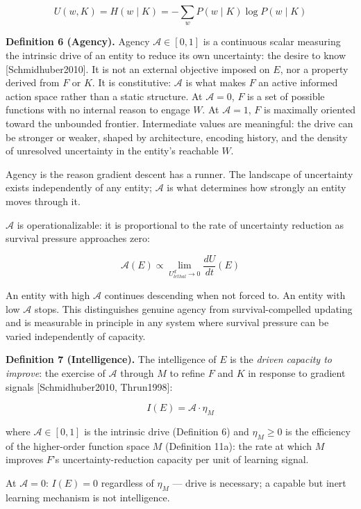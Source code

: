 \documentclass[
]{article}
\begin{document}
\[U(w, K) = H(w \mid K) = -\sum_w P(w \mid K) \log P(w \mid K)\]

\textbf{Definition 6 (Agency).} Agency \(\mathcal{A} \in [0, 1]\) is a
continuous scalar measuring the intrinsic drive of an entity to reduce
its own uncertainty: the desire to know {[}Schmidhuber2010{]}. It is not
an external objective imposed on \(E\), nor a property derived from
\(F\) or \(K\). It is constitutive: \(\mathcal{A}\) is what makes \(F\)
an active informed action space rather than a static structure. At
\(\mathcal{A} = 0\), \(F\) is a set of possible functions with no
internal reason to engage \(W\). At \(\mathcal{A} = 1\), \(F\) is
maximally oriented toward the unbounded frontier. Intermediate values
are meaningful: the drive can be stronger or weaker, shaped by
architecture, encoding history, and the density of unresolved
uncertainty in the entity's reachable \(W\).

Agency is the reason gradient descent has a runner. The landscape of
uncertainty exists independently of any entity; \(\mathcal{A}\) is what
determines how strongly an entity moves through it.

\(\mathcal{A}\) is operationalizable: it is proportional to the rate of
uncertainty reduction as survival pressure approaches zero:

\[\mathcal{A}(E) \propto \lim_{U_{lethal}^d \to 0} \frac{dU}{dt}(E)\]

An entity with high \(\mathcal{A}\) continues descending when not forced
to. An entity with low \(\mathcal{A}\) stops. This distinguishes genuine
agency from survival-compelled updating and is measurable in principle
in any system where survival pressure can be varied independently of
capacity.

\textbf{Definition 7 (Intelligence).} The intelligence of \(E\) is the
\emph{driven capacity to improve}: the exercise of \(\mathcal{A}\)
through \(M\) to refine \(F\) and \(K\) in response to gradient signals
{[}Schmidhuber2010, Thrun1998{]}:

\[I(E) = \mathcal{A} \cdot \eta_M\]

where \(\mathcal{A} \in [0, 1]\) is the intrinsic drive (Definition 6)
and \(\eta_M \geq 0\) is the efficiency of the higher-order function
space \(M\) (Definition 11a): the rate at which \(M\) improves \(F\)'s
uncertainty-reduction capacity per unit of learning signal.

At \(\mathcal{A} = 0\): \(I(E) = 0\) regardless of \(\eta_M\) --- drive
is necessary; a capable but inert learning mechanism is not
intelligence.
\end{document}
